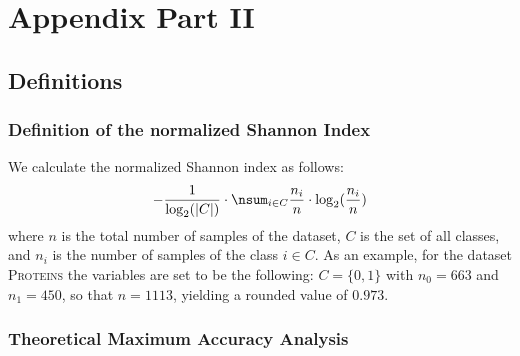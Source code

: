 \chapter{Appendix Part II}
\section{Definitions}
\subsection{Definition of the normalized Shannon Index}\label{sec:definition_shannon_index}
We calculate the normalized Shannon index as follows:
\begin{equation}
	- \frac{1}{\log_2(|C|)} \cdot \nsum_{i \in C} \frac{n_i}{n} \cdot \log_2 (\frac{n_i}{n})
\end{equation}
where $n$ is the total number of samples of the dataset, $C$ is the set of all classes, and $n_i$ is the number of samples of the class $i \in C$. As an example, for the dataset \textsc{Proteins} the variables are set to be the following: $C = \{0, 1\}$ with $n_0 = 663$ and $n_1 = 450$, so that $n = 1113$, yielding a rounded value of $0.973$.

\subsection{Theoretical Maximum Accuracy Analysis}

